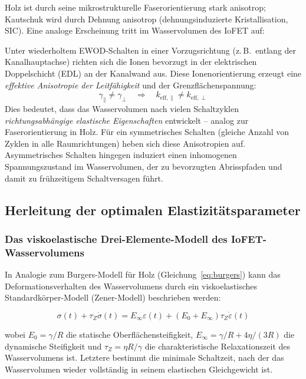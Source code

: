 ﻿\documentclass[a4paper,12pt]{scrreprt}
\theoremstyle{definition}
\begin{document}
Holz ist durch seine mikrostrukturelle Faserorientierung stark anisotrop;
Kautschuk wird durch Dehnung anisotrop (dehnungsinduzierte Kristallisation,
SIC). Eine analoge Erscheinung tritt im Wasservolumen des IoFET auf:

Unter wiederholtem EWOD-Schalten in einer Vorzugsrichtung (z.\,B.\ entlang
der Kanalhauptachse) richten sich die Ionen bevorzugt in der elektrischen
Doppelschicht (EDL) an der Kanalwand aus. Diese Ionenorientierung erzeugt
eine \emph{effektive Anisotropie der Leitfähigkeit} und der Grenzflächenspannung:
\begin{equation}
	\gamma_{\parallel} \neq \gamma_{\perp}
	\quad \Rightarrow \quad
	k_{\mathrm{eff},\parallel} \neq k_{\mathrm{eff},\perp}
	\label{eq:anisotropie_wasser}
\end{equation}
Dies bedeutet, dass das Wasservolumen nach vielen Schaltzyklen
\emph{richtungsabhängige elastische Eigenschaften} entwickelt -- analog
zur Faserorientierung in Holz. Für ein symmetrisches Schalten (gleiche
Anzahl von Zyklen in alle Raumrichtungen) heben sich diese Anisotropien
auf. Asymmetrisches Schalten hingegen induziert einen inhomogenen
Spannungszustand im Wasservolumen, der zu bevorzugten Abrisspfaden und
damit zu frühzeitigem Schaltversagen führt.

\subsection{Herleitung der optimalen Elastizitätsparameter}

\subsubsection{Das viskoelastische Drei-Elemente-Modell des IoFET-Wasservolumens}

In Analogie zum Burgers-Modell für Holz (Gleichung~\eqref{eq:burgers}) kann
das Deformationsverhalten des Wasservolumens durch ein viskoelastisches
Standardkörper-Modell (Zener-Modell) beschrieben werden:

\begin{equation}
	\sigma(t) + \tau_Z \dot{\sigma}(t) = E_\infty \varepsilon(t)
	+ \left(E_0 + E_\infty\right) \tau_Z \dot{\varepsilon}(t)
	\label{eq:zener_modell}
\end{equation}

wobei $E_0 = \gamma / R$ die statische Oberflächensteifigkeit,
$E_\infty = \gamma / R + 4\eta / (3 R)$ die dynamische Steifigkeit und
$\tau_Z = \eta R / \gamma$ die charakteristische Relaxationszeit des
Wasservolumens ist. Letztere bestimmt die minimale Schaltzeit, nach der
das Wasservolumen wieder vollständig in seinem elastischen Gleichgewicht ist.
\end{document}
